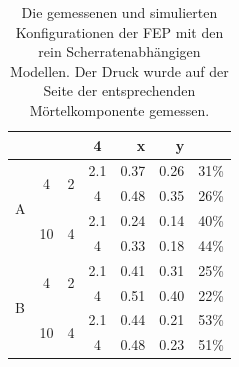 \begin{table}[tb]
{\begin{tabular}{l c c c r r r}
                              &                     &                    & 4   & x & y & \\
    \hline
    \hline
    \multirow{4}{*}{\re{} A} &  \multirow{2}{*}{4} & \multirow{2}{*}{2}  & 2.1 & 0.37 & 0.26 &31\%\\
                                                    \cline{4-7}
                              &                     &                    & 4   & 0.48 & 0.35 &26\%\\
                              \cline{2-7}
                              & \multirow{2}{*}{10} & \multirow{2}{*}{4} & 2.1 & 0.24 & 0.14 &40\%\\
                                                    \cline{4-7}
                              &                     &                    & 4   & 0.33 & 0.18 &44\%\\
    \hline
    \hline
    \multirow{4}{*}{\re{} B} &  \multirow{2}{*}{4} & \multirow{2}{*}{2}  & 2.1 & 0.41 & 0.31 &25\%\\
                                                    \cline{4-7}
                              &                     &                    & 4   & 0.51 & 0.40 &22\%\\
                              \cline{2-7}
                              & \multirow{2}{*}{10} & \multirow{2}{*}{4} & 2.1 & 0.44 & 0.21 &53\%\\
                                                    \cline{4-7}
                              &                     &                    & 4   & 0.48 & 0.23 &51\%\\
    \hline\hline
\end{tabular}}
    \caption{Die gemessenen und simulierten Konfigurationen der FEP mit den rein Scherratenabhängigen Modellen. Der Druck wurde auf der Seite der entsprechenden Mörtelkomponente gemessen.}
    \label{fig:fepVergleich}
\end{table}
%
